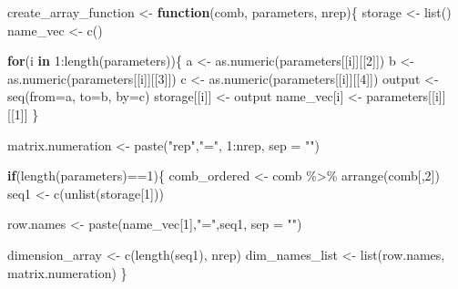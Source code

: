 \documentclass[11pt,a4paper]{article}
\newenvironment{Shaded}{\begin{snugshade}}{\end{snugshade}}
\newcommand{\AttributeTok}[1]{\textcolor[rgb]{0.77,0.63,0.00}{#1}}
\newcommand{\ControlFlowTok}[1]{\textcolor[rgb]{0.13,0.29,0.53}{\textbf{#1}}}
\newcommand{\DecValTok}[1]{\textcolor[rgb]{0.00,0.00,0.81}{#1}}
\newcommand{\FunctionTok}[1]{\textcolor[rgb]{0.00,0.00,0.00}{#1}}
\newcommand{\NormalTok}[1]{#1}
\newcommand{\OtherTok}[1]{\textcolor[rgb]{0.56,0.35,0.01}{#1}}
\newcommand{\SpecialCharTok}[1]{\textcolor[rgb]{0.00,0.00,0.00}{#1}}
\newcommand{\StringTok}[1]{\textcolor[rgb]{0.31,0.60,0.02}{#1}}
\begin{document}
\begin{Shaded}
\begin{Highlighting}[]
\NormalTok{create\_array\_function }\OtherTok{\textless{}{-}} \ControlFlowTok{function}\NormalTok{(comb, parameters, nrep)\{}
\NormalTok{  storage }\OtherTok{\textless{}{-}} \FunctionTok{list}\NormalTok{()}
\NormalTok{  name\_vec }\OtherTok{\textless{}{-}} \FunctionTok{c}\NormalTok{()}
  
  \ControlFlowTok{for}\NormalTok{(i }\ControlFlowTok{in} \DecValTok{1}\SpecialCharTok{:}\FunctionTok{length}\NormalTok{(parameters))\{ }
\NormalTok{    a }\OtherTok{\textless{}{-}} \FunctionTok{as.numeric}\NormalTok{(parameters[[i]][[}\DecValTok{2}\NormalTok{]])}
\NormalTok{    b }\OtherTok{\textless{}{-}} \FunctionTok{as.numeric}\NormalTok{(parameters[[i]][[}\DecValTok{3}\NormalTok{]])}
\NormalTok{    c }\OtherTok{\textless{}{-}} \FunctionTok{as.numeric}\NormalTok{(parameters[[i]][[}\DecValTok{4}\NormalTok{]])}
\NormalTok{    output }\OtherTok{\textless{}{-}} \FunctionTok{seq}\NormalTok{(}\AttributeTok{from=}\NormalTok{a, }\AttributeTok{to=}\NormalTok{b, }\AttributeTok{by=}\NormalTok{c)}
\NormalTok{    storage[[i]] }\OtherTok{\textless{}{-}}\NormalTok{  output}
\NormalTok{    name\_vec[i] }\OtherTok{\textless{}{-}}\NormalTok{ parameters[[i]][[}\DecValTok{1}\NormalTok{]] }
\NormalTok{  \}}
  
  
\NormalTok{  matrix.numeration }\OtherTok{\textless{}{-}}  \FunctionTok{paste}\NormalTok{(}\StringTok{"rep"}\NormalTok{,}\StringTok{"="}\NormalTok{, }\DecValTok{1}\SpecialCharTok{:}\NormalTok{nrep, }\AttributeTok{sep =} \StringTok{""}\NormalTok{)}
  
  \ControlFlowTok{if}\NormalTok{(}\FunctionTok{length}\NormalTok{(parameters)}\SpecialCharTok{==}\DecValTok{1}\NormalTok{)\{}
\NormalTok{    comb\_ordered }\OtherTok{\textless{}{-}}\NormalTok{  comb }\SpecialCharTok{\%\textgreater{}\%} \FunctionTok{arrange}\NormalTok{(comb[,}\DecValTok{2}\NormalTok{])}
\NormalTok{    seq1 }\OtherTok{\textless{}{-}} \FunctionTok{c}\NormalTok{(}\FunctionTok{unlist}\NormalTok{(storage[}\DecValTok{1}\NormalTok{]))}
    
\NormalTok{    row.names }\OtherTok{\textless{}{-}} \FunctionTok{paste}\NormalTok{(name\_vec[}\DecValTok{1}\NormalTok{],}\StringTok{"="}\NormalTok{,seq1, }\AttributeTok{sep =} \StringTok{""}\NormalTok{)}
    
\NormalTok{    dimension\_array }\OtherTok{\textless{}{-}} \FunctionTok{c}\NormalTok{(}\FunctionTok{length}\NormalTok{(seq1), nrep)}
\NormalTok{    dim\_names\_list }\OtherTok{\textless{}{-}} \FunctionTok{list}\NormalTok{(row.names, matrix.numeration)}
\NormalTok{  \}}
  

\end{Highlighting}
\end{Shaded}
\end{document}
